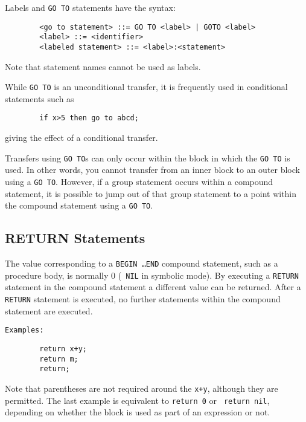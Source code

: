 Labels and {\tt GO TO} statements have the syntax:
\begin{verbatim}
        <go to statement> ::= GO TO <label> | GOTO <label>
        <label> ::= <identifier>
        <labeled statement> ::= <label>:<statement>
\end{verbatim}
Note that statement names cannot be used as labels.

While {\tt GO TO} is an unconditional transfer, it is frequently used
in conditional statements such as
\begin{verbatim}
        if x>5 then go to abcd;
\end{verbatim}
giving the effect of a conditional transfer.

Transfers using {\tt GO TO}s can only occur within the block in which the
{\tt GO TO} is used.  In other words, you cannot transfer from an inner
block to an outer block using a {\tt GO TO}.  However, if a group statement
occurs within a compound statement, it is possible to jump out of that group
statement to a point within the compound statement using a {\tt GO TO}.

\subsection{RETURN Statements}

The value corresponding to a {\tt BEGIN \ldots END} compound statement,
 such as a procedure body, is normally 0 ({\tt
NIL} in symbolic mode).  By executing a {\tt RETURN}
statement in the compound statement a different value can be returned.
After a {\tt RETURN} statement is executed, no further statements within
the compound statement are executed.

{\tt Examples:}
\begin{verbatim}
        return x+y;
        return m;
        return;
\end{verbatim}
Note that parentheses are not required around the {\tt x+y}, although they
are permitted.  The last example is equivalent to {\tt return 0} or {\tt
return nil}, depending on whether the block is used as part of an
expression or not.

